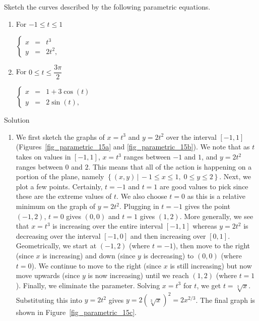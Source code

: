 \begin{example} \label{parametrictorect}  Sketch the curves described by the following parametric equations.  

\begin{multicols}{2}
\begin{enumerate}

\item For $-1 \leq t \leq 1$ 

$\left\{\begin{array}{rcl} x & = & t^3 \\[0.2cm] y & = & 2t^2, \end{array}\right. $


\item  \label{parametricellipse} For $0 \leq t \leq \dfrac{3\pi}{2}$
 
$ \left\{\begin{array}{rcl} x & = & 1 + 3\cos(t) \\[0.2cm] y & = & 2\sin(t), \end{array}\right. $


\end{enumerate}
\end{multicols}
Solution 
\begin{enumerate}
\item  We first sketch the graphs of $x = t^3$ and $y =  2t^2$ over the interval $[-1,1]$ (Figures~\ref{fig_parametric_15a} and \ref{fig_parametric_15b}). We note that as $t$ takes on values in $[-1,1]$, $x = t^3$ ranges between $-1$ and $1$, and $y =  2t^2$ ranges between $0$ and $2$.    This means that all of the action is happening on a portion of the plane, namely $\left\{ (x,y) \, | \, -1 \leq x \leq 1, \; 0 \leq y \leq 2 \right\}$.  Next, we plot a few points.  Certainly, $t=-1$ and $t=1$ are good values to pick since these are the extreme values of $t$.  We also choose $t=0$ as this is a relative minimum on the graph of $y = 2t^2$.   Plugging in $t = -1$ gives the point $(-1,2)$, $t = 0$ gives $(0,0)$ and $t=1$ gives $(1,2)$. More generally, we see that $x = t^3$ is increasing over the entire interval $[-1,1]$ whereas $y = 2t^2$  is decreasing over the interval $[-1,0]$ and then increasing over $[0,1]$.  Geometrically, we start at $(-1,2)$ (where $t=-1$), then move to the right (since $x$ is increasing) and down (since $y$ is decreasing) to $(0,0)$ (where $t = 0$).  We continue to move to the right (since $x$ is still increasing) but now move upwards (since $y$ is now increasing) until we reach $(1,2)$ (where $t=1$).   Finally,  we eliminate the parameter.  Solving $x = t^3$ for $t$, we get $t = \sqrt[3]{x}$. Substituting this into $y = 2t^2$ gives $y = 2(\sqrt[3]{x})^2 =  2x^{2/3}$. The final graph is shown in Figure~\ref{fig_parametric_15c}.


\end{enumerate}
\end{example}
